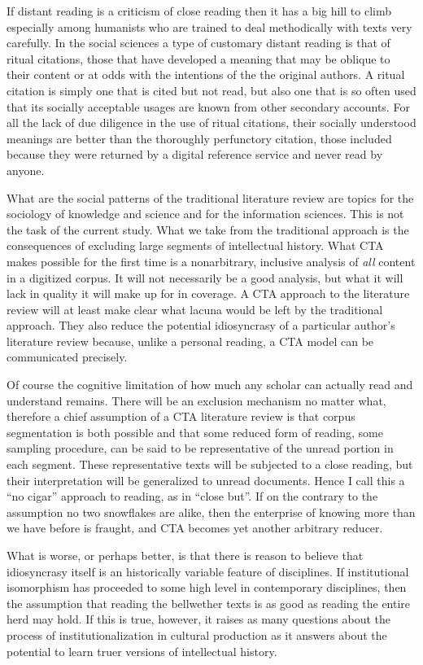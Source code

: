 \documentclass[]{book}
\theoremstyle{definition}
\theoremstyle{definition}
\theoremstyle{definition}
\theoremstyle{remark}
\begin{document}
If distant reading is a criticism of close reading then it has a big
hill to climb especially among humanists who are trained to deal
methodically with texts very carefully. In the social sciences a type of
customary distant reading is that of ritual citations, those that have
developed a meaning that may be oblique to their content or at odds with
the intentions of the the original authors. A ritual citation is simply
one that is cited but not read, but also one that is so often used that
its socially acceptable usages are known from other secondary accounts.
For all the lack of due diligence in the use of ritual citations, their
socially understood meanings are better than the thoroughly perfunctory
citation, those included because they were returned by a digital
reference service and never read by anyone.

What are the social patterns of the traditional literature review are
topics for the sociology of knowledge and science and for the
information sciences. This is not the task of the current study. What we
take from the traditional approach is the consequences of excluding
large segments of intellectual history. What CTA makes possible for the
first time is a nonarbitrary, inclusive analysis of \emph{all} content
in a digitized corpus. It will not necessarily be a good analysis, but
what it will lack in quality it will make up for in coverage. A CTA
approach to the literature review will at least make clear what lacuna
would be left by the traditional approach. They also reduce the
potential idiosyncrasy of a particular author's literature review
because, unlike a personal reading, a CTA model can be communicated
precisely.

Of course the cognitive limitation of how much any scholar can actually
read and understand remains. There will be an exclusion mechanism no
matter what, therefore a chief assumption of a CTA literature review is
that corpus segmentation is both possible and that some reduced form of
reading, some sampling procedure, can be said to be representative of
the unread portion in each segment. These representative texts will be
subjected to a close reading, but their interpretation will be
generalized to unread documents. Hence I call this a ``no cigar''
approach to reading, as in ``close but''. If on the contrary to the
assumption no two snowflakes are alike, then the enterprise of knowing
more than we have before is fraught, and CTA becomes yet another
arbitrary reducer.

What is worse, or perhaps better, is that there is reason to believe
that idiosyncrasy itself is an historically variable feature of
disciplines. If institutional isomorphism has proceeded to some high
level in contemporary disciplines, then the assumption that reading the
bellwether texts is as good as reading the entire herd may hold. If this
is true, however, it raises as many questions about the process of
institutionalization in cultural production as it answers about the
potential to learn truer versions of intellectual history.
\end{document}
